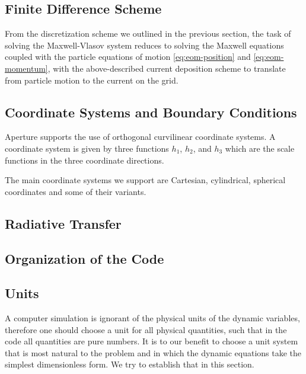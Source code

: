 
\subsection{Finite Difference Scheme}
\label{sec:finite-difference}

From the discretization scheme we outlined in the previous section, the task of
solving the Maxwell-Vlasov system reduces to solving the Maxwell equations
coupled with the particle equations of motion \eqref{eq:eom-position} and
\eqref{eq:eom-momentum}, with the above-described current deposition scheme to
translate from particle motion to the current on the grid.

\subsection{Coordinate Systems and Boundary Conditions}
\label{sec:coord-syst-sing}

Aperture supports the use of orthogonal curvilinear coordinate
systems. A coordinate system is given by three functions $h_1$, $h_2$,
and $h_3$ which are the scale functions in the three coordinate
directions.

The main coordinate systems we support are Cartesian, cylindrical,
spherical coordinates and some of their variants.

\subsection{Radiative Transfer}
\label{sec:radiative-transfer}

\subsection{Organization of the Code}
\label{sec:code-organization}

\subsection{Units}
\label{sec:pic-units}

A computer simulation is ignorant of the physical units of the dynamic
variables, therefore one should choose a unit for all physical quantities, such
that in the code all quantities are pure numbers. It is to our benefit to choose
a unit system that is most natural to the problem and in which the dynamic
equations take the simplest dimensionless form. We try to establish that in this
section.

